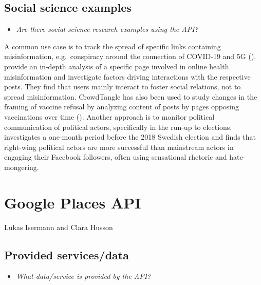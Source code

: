 \documentclass[
]{book}
\providecommand{\tightlist}{%
  \setlength{\itemsep}{0pt}\setlength{\parskip}{0pt}}
\begin{document}
\hypertarget{social-science-examples-2}{%
\section{Social science examples}\label{social-science-examples-2}}

\begin{itemize}
\tightlist
\item
  \emph{Are there social science research examples using the API?}
\end{itemize}

A common use case is to track the spread of specific links containing misinformation, e.g.~conspiracy around the connection of COVID-19 and 5G (\citet{Bruns2020-pl}).
\citet{Berriche2020-dt} provide an in-depth analysis of a specific page involved in online health misinformation and investigate factors driving interactions with the respective posts. They find that users mainly interact to foster social relations, not to spread misinformation.
CrowdTangle has also been used to study changes in the framing of vaccine refusal by analyzing content of posts by pages opposing vaccinations over time (\citet{Broniatowski2020-rh}).
Another approach is to monitor political communication of political actors, specifically in the run-up to elections. \citet{Larsson2020-iu} investigates a one-month period before the 2018 Swedish election and finds that right-wing political actors are more successful than mainstream actors in engaging their Facebook followers, often using sensational rhetoric and hate-mongering.

\hypertarget{google-places-api}{%
\chapter{Google Places API}\label{google-places-api}}

Lukas Isermann and Clara Husson

\hypertarget{provided-servicesdata-3}{%
\section{Provided services/data}\label{provided-servicesdata-3}}

\begin{itemize}
\tightlist
\item
  \emph{What data/service is provided by the API?}
\end{itemize}
\end{document}
